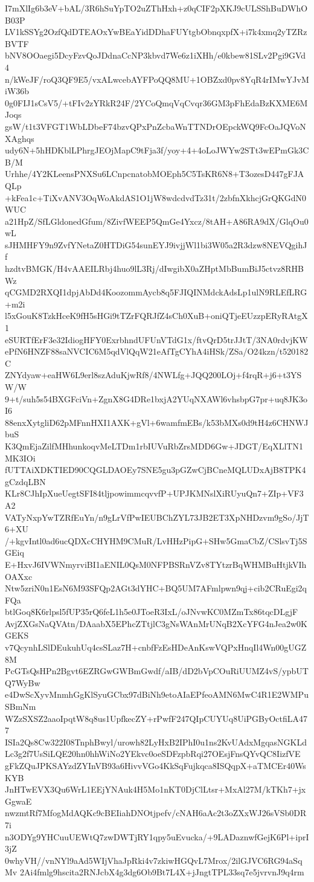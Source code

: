 I7mXlIg6b3eV+bAL/3R6hSuYpTO2uZThHxh+z0qCIF2pXKJ9cULSShBuDWhOB03P
LV1kSSYg2OzfQdDTEAOxYwBEaYidDDhaFUYtgbObnqxpfX+i7k4xmq2yTZRzBVTF
bNV8OOaegi5DcyFzvQoJDdnaCcNP3kbvd7We6z1iXHh/e0kbew81SLv2Pgi9GVd4
n/kWeJF/roQ3QF9E5/vxALwcebAYFPoQQ8MU+1OBZxd0pv8YqR4rIMwYJvMiW36b
0g0FIJ1sCsV5/+tFIv2zYRkR24F/2YCoQmqVqCvqr36GM3pFhEdaBzKXME6MJoqs
gsW/t1t3VFGT1WbLDbeF74bzvQPxPnZcbaWnTTNDrOEpckWQ9FcOaJQVoNXAghqs
udy6N+5hHDKblLPhrgJEOjMapC9tFja3f/yoy+4+4oLoJWYw2STt3wEPmGk3CB/M
Urhhe/4Y2KLeensPNXSu6LCnpcnatobMOEph5C5TsKR6N8+T3ozesD447gFJAQLp
+kFea1c+TiXvANV3OqWoAkdAS1O1jW8wdcdvdTz31t/2zbfnXkhcjGrQKGdN0WUC
a21HpZ/SfLGldonedGfum/8ZivfWEEP5QmGe4Yxcz/8tAH+A86RA9dX/GlqOu0wL
sJHMHFY9n9ZvfYNetaZ0HTDiG54sunEYJ9ivjjWl1bi3W05a2R3dzw8NEVQgihJf
hzdtvBMGK/H4vAAEILRbj4huo9lL3Rj/dIwgibX0aZHptMbBumBiJ5ctvz8RHBWz
qCGMD2RXQI1dpjAbDd4KoozommAycb8q5FJIQINMdckAdsLp1ulN9RLEfLRG+m2i
l5xGouK8TzkHceK9fH5sHGi9tTZrFQRJfZ4sCh0XuB+oniQTjeEUzzpERyRAtgX1
eSURTfErF3e32IdiogHFY0ExrbhndUFUnVTdG1x/ftvQrD5trJJtT/3NA0rdvjKW
ePfN6HNZF88saNVCIC6M5qdVlQqW21eAfTgCYhA4iHSk/ZSa/O24kzn/t520182C
ZNYdyaw+eaHW6L9erl8szAduKjwRf8/4NWLfg+JQQ200LOj+f4rqR+j6+t3YSW/W
9+t/suh5s54BXGFciVn+ZgnX8G4DRe1bxjA2YUqNXAWl6vhsbpG7pr+uq8JK3oI6
88enxXytgliD62pMFnnHXI1AXK+gVl+6wamfmEBs/k53bMXs0d9tH4z6CHNWJbuS
K3QmEjaZilfMHhunkoqvMeLTDm1rbIUVuRbZrsMDD6Gw+JDGT/EqXLlTN1MK3IOi
fUTTAiXDKTIED90CQGLDAOEy7SNE5gu3pGZwCjBCneMQLUDxAjB8TPK4gCzdqLBN
KLr8CJhIpXueUegtSFI84tljpowimmcqvvfP+UPJKMNslXiRUyuQn7+ZIp+VF3A2
VATyNxpYwTZRfEuYn/n9gLrVfPwIEUBChZYL73JB2ET3XpNHDzvm9gSo/JjT6+XU
/+kgvIntl0ad6ucQDXcCHYHM9CMuR/LvHHzPipG+SHw5GmaCbZ/CSlsvTj5SGEiq
E+HxvJ6IVWNmyrviBI1aENIL0QsM0NFPBSRnVZv8TYtzrBqWHMBuHtjkVIhOAXxc
Ntw5zriN0n1EsN6M93SFQp2AGt3dYHC+BQ5UM7AFmlpwn9qj+cib2CRuEgi2qFQa
btlGoq8K6rlpsl5fUP35rQ6feL1h5e0JToeR3IxL/oJNvwKC0MZmTx86tqcDLgjF
AvjZXGsNaQVAtn/DAaabX5EPhcZTtjlC3gNsWAnMrUNqB2XcYFG4nJea2w0KGEKS
v7QcynhLSlDEukuhUq4csSLaz7H+cnbfFzEsHDeAnKswVQPxHnqIl4Wn00gUGZ8M
PcGTsQsHPn2Bgvt6EZRGwGWBmGwdf/aIB/dD2bVpCOuRiUUMZ4vS/ypbUTQ7WyBw
e4DwScXyvMnmhGgKlSyuGCbx97dBiNh9etoAIaEPfeoAMN6MwC4R1E2WMPuSBmNm
WZzSXSZ2aaoIpqtW8q8us1UpfkecZY+rPwfF247QIpCUYUq8UiPGByOctfiLA477
ISIa2Qs8Cw322I08TnphBwyl/urowh82LyHxB2IPhI0u1ns2KvUAdxMgqasNGKLd
Lc3g2f7UsSiLQE20hn0hhWiNo2YEkvc0oeSDFzpbRqi27OEsjFnsQYvQC8IizfVE
gFkZQuJPKSAYzdZYInVB93a6HivvVGo4KkSqFujkqca8ISQqpX+aTMCEr40WsKYB
JnHTwEVX3Qu6WrL1EEjYNAuk4H5Mo1nKT0DjClLtsr+MxAl27M/kTKh7+jxGgwaE
nwzmtRf7MfogMdAQKc9cBEIiahDNOtjpefv/cNAH6aAc2t3oZXxWJ26sVSb0DR7i
n3ODYg9YHCuuUEWtQ7zwDWTjRY1qpy5uEvucka/+9LADaznwfGejK6Pl+iprI3jZ
0whyVH//vnNYl9aAd5WIjVhaJpRki4v7zkiwHGQvL7Mrox/2ilGJVC6RG94aSqMv
2Ai4fmlg9hscita2RNJcbX4g3dg6Ob9Bt7L4X+jJngtTPL33sq7e5jvrvnJ9q4rm
